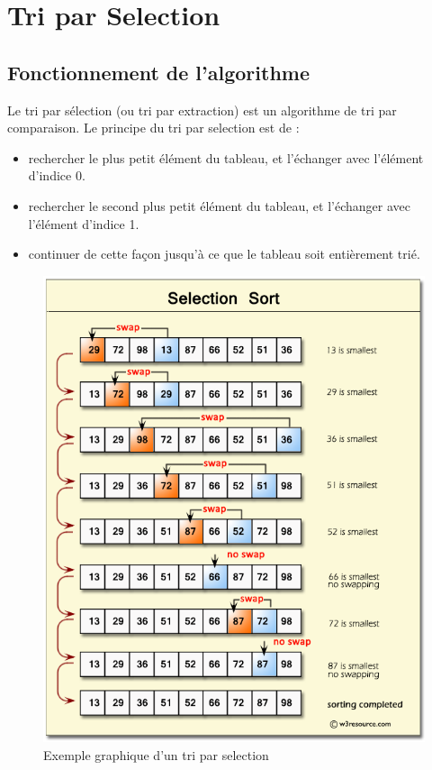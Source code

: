 \chapter{Tri par Selection}
\section{Fonctionnement de l'algorithme}
Le tri par sélection (ou tri par extraction) est un algorithme de tri par comparaison.
Le principe du tri par selection est de :
\begin{itemize}
  \item rechercher le plus petit élément du tableau, et l'échanger avec l'élément d'indice 0.
  \item rechercher le second plus petit élément du tableau, et l'échanger avec l'élément d'indice 1.
  \item continuer de cette façon jusqu'à ce que le tableau soit entièrement trié.
\end{itemize}
\begin{figure}[H]
    \centering
        \includegraphics[scale=0.4]{ressources/selection-short.png}
        \caption{Exemple graphique d’un tri par selection}
    \label{fig:fusion}
\end{figure}
